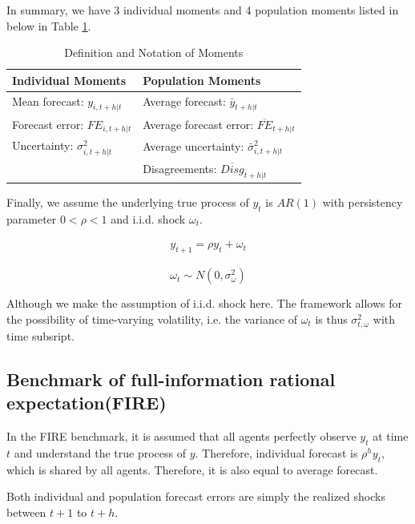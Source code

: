 \documentclass[]{article}
\begin{document}
	In summary, we have 3 individual moments and 4 population moments listed in below in Table \ref{MomSum}.
	
	\begin{table}[ht]
		\centering
		\caption{Definition and Notation of Moments}
		\label{MomSum}
		\begin{tabular}{ll}
			
			\hline 
			Individual Moments                                  & Population Moments                             \\
			\hline 
			Mean forecast: $y_{i,t+h|t}$                   & Average forecast: $\bar y_{t+h|t}$                   \\
			Forecast error: $FE_{i,t+h|t}$ & Average forecast error: $\overline{FE}_{t+h|t}$ \\
			Uncertainty: $\sigma^2_{i,t+h|t}$         & Average uncertainty:  $\bar \sigma^2_{i,t+h|t}$ \\
			& Disagreements:  $\overline{Disg}_{t+h|t}$       \\
			\hline 
		\end{tabular}
	\end{table}
	
	Finally, we assume the underlying true process of $y_{t}$ is $AR(1)$ with persistency parameter $0<\rho <1$ and i.i.d. shock $\omega_t$. 
	
	\begin{eqnarray}\label{AR_process}
		y_{t+1} = \rho y_t + \omega_t
	\end{eqnarray}
	
	$$\omega_t \sim N(0,\sigma^2_{\omega})$$
	
	Although we make the assumption of i.i.d. shock here. The framework allows for the possibility of time-varying volatility, i.e. the variance of $\omega_t$ is thus $\sigma^2_{t,\omega}$ with time subsript. 
	
	\subsection{Benchmark of full-information rational expectation(FIRE)}
	
	In the FIRE benchmark,  it is assumed that all agents perfectly observe $y_t$ at time $t$ and understand the true process of $y$. Therefore, individual forecast is $\rho^h y_t $, which is shared by all agents. Therefore, it is also equal to average forecast. 
	
	Both individual and population forecast errors are simply the realized shocks between $t+1$ to $t+h$.  
	
\end{document}
